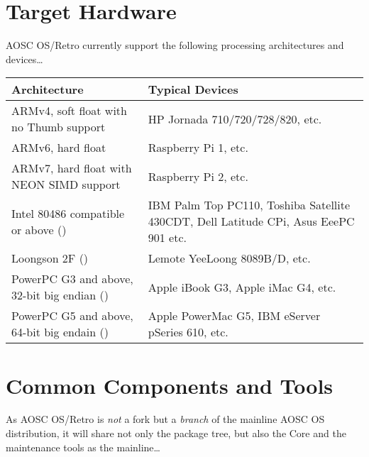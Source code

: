     \section{Target Hardware}
    
    AOSC OS/Retro currently support the following processing architectures and devices\ldots

    \begin{longtabu} {XX}
        {Architecture} &
        {Typical Devices}\\
        \hline
        {ARMv4, soft float with no Thumb support}
            & {HP Jornada 710/720/728/820, etc.}\\
        {ARMv6, hard float}
            & {Raspberry Pi 1, etc.}\\
        {ARMv7, hard float with NEON SIMD support}
            & {Raspberry Pi 2, etc.}\\
        {Intel 80486 compatible or above ()}
            & {IBM Palm Top PC110, Toshiba Satellite 430CDT, Dell Latitude CPi, Asus EeePC 901 etc.}\\
        {Loongson 2F ()}
            & {Lemote YeeLoong 8089B/D, etc.}\\
        {PowerPC G3 and above, 32-bit big endian ()}
            & {Apple iBook G3, Apple iMac G4, etc.}\\
        {PowerPC G5 and above, 64-bit big endain ()}
            & {Apple PowerMac G5, IBM eServer pSeries 610, etc.}\\
        \hline
    \end{longtabu}

    \section{Common Components and Tools}
    
    As AOSC OS/Retro is \textit{not} a fork but a \textit{branch} of the mainline AOSC OS distribution,
    it will share not only the package tree, but also the Core and the maintenance tools as the mainline\ldots
    

